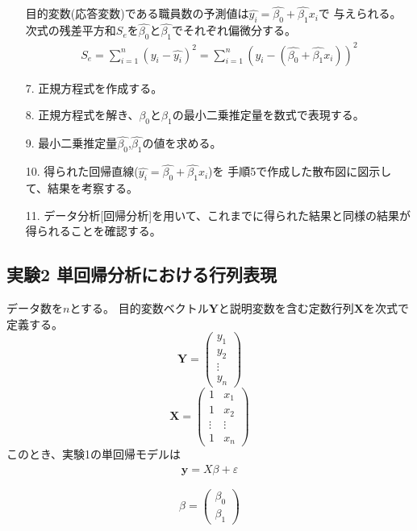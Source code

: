 \documentclass[12pt]{jarticle}
\begin{document}
\begin{itemize}
          目的変数(応答変数)である職員数の予測値は$\hat{y_i}=\hat{\beta_0}+\hat{\beta_1}x_i$で
          与えられる。
          次式の残差平方和$S_e$を$\hat{\beta_0}$と$\hat{\beta_1}$でそれぞれ偏微分する。
          \begin{eqnarray}
              S_e=\sum_{i=1}^{n} (y_i-\hat{y_i})^2 = \sum_{i=1}^{n} (y_i-(\hat{\beta_0}+\hat{\beta_1}x_i))^2
          \end{eqnarray}
    \item [7.]正規方程式を作成する。
    \item [8.]正規方程式を解き、$\beta_0$と$\beta_1$の最小二乗推定量を数式で表現する。
    \item [9.]最小二乗推定量$\hat{\beta_0}$,$\hat{\beta_1}$の値を求める。
    \item [10.]得られた回帰直線($\hat{y_i}=\hat{\beta_0}+\hat{\beta_1}x_i$)を
          手順5で作成した散布図に図示して、結果を考察する。
    \item [11.]データ分析[回帰分析]を用いて、これまでに得られた結果と同様の結果が得られることを確認する。
\end{itemize}

\clearpage

\subsection{実験2 単回帰分析における行列表現}
データ数を$n$とする。
目的変数ベクトル$\bm Y$と説明変数を含む定数行列$\bm X$を次式で定義する。
\[
    \bm Y = \left(
    \begin{array}{c}
            y_1    \\
            y_2    \\
            \vdots \\
            y_n
        \end{array}
    \right)
\]
\[
    \bm X = \left(
    \begin{array}{cc}
            1      & x_1    \\
            1      & x_2    \\
            \vdots & \vdots \\
            1      & x_n
        \end{array}
    \right)
\]
このとき、実験1の単回帰モデルは
\begin{eqnarray}
    \bm y=X\beta+\varepsilon
\end{eqnarray}

\[
    \beta = \left(
    \begin{array}{c}
            \beta_0 \\
            \beta_1
        \end{array}
    \right)
\]
\end{document}
